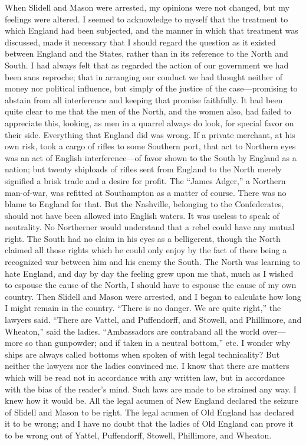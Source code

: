 When Slidell and Mason were arrested, my opinions were not changed,
but my feelings were altered.  I seemed to acknowledge to myself
that the treatment to which England had been subjected, and the
manner in which that treatment was discussed, made it necessary
that I should regard the question as it existed between England and
the States, rather than in its reference to the North and South.  I
had always felt that as regarded the action of our government we
had been sans reproche; that in arranging our conduct we had
thought neither of money nor political influence, but simply of the
justice of the case---promising to abstain from all interference and
keeping that promise faithfully.  It had been quite clear to me
that the men of the North, and the women also, had failed to
appreciate this, looking, as men in a quarrel always do look, for
special favor on their side.  Everything that England did was
wrong.  If a private merchant, at his own risk, took a cargo of
rifles to some Southern port, that act to Northern eyes was an act
of English interference---of favor shown to the South by England as
a nation; but twenty shiploads of rifles sent from England to the
North merely signified a brisk trade and a desire for profit.  The
``James Adger,'' a Northern man-of-war, was refitted at Southampton
as a matter of course.  There was no blame to England for that.
But the Nashville, belonging to the Confederates, should not have
been allowed into English waters.  It was useless to speak of
neutrality.  No Northerner would understand that a rebel could have
any mutual right.  The South had no claim in his eyes as a
belligerent, though the North claimed all those rights which he
could only enjoy by the fact of there being a recognized war
between him and his enemy the South.  The North was learning to
hate England, and day by day the feeling grew upon me that, much as
I wished to espouse the cause of the North, I should have to
espouse the cause of my own country.  Then Slidell and Mason were
arrested, and I began to calculate how long I might remain in the
country.  ``There is no danger.  We are quite right,'' the lawyers
said.  ``There are Vattel, and Puffendorff, and Stowell, and
Phillimore, and Wheaton,'' said the ladies.  ``Ambassadors are
contraband all the world over---more so than gunpowder; and if taken
in a neutral bottom,'' etc.  I wonder why ships are always called
bottoms when spoken of with legal technicality?  But neither the
lawyers nor the ladies convinced me.  I know that there are matters
which will be read not in accordance with any written law, but in
accordance with the bias of the reader's mind.  Such laws are made
to be strained any way.  I knew how it would be.  All the legal
acumen of New England declared the seizure of Slidell and Mason to
be right.  The legal acumen of Old England has declared it to be
wrong; and I have no doubt that the ladies of Old England can prove
it to be wrong out of Yattel, Puffendorff, Stowell, Phillimore, and
Wheaton.

